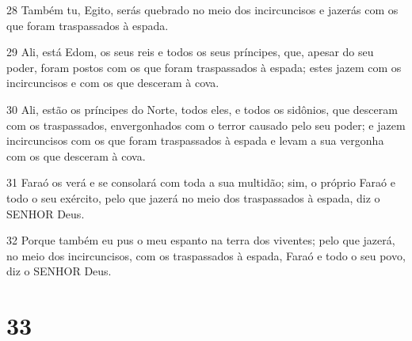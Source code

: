 \par 28 Também tu, Egito, serás quebrado no meio dos incircuncisos e jazerás com os que foram traspassados à espada.
\par 29 Ali, está Edom, os seus reis e todos os seus príncipes, que, apesar do seu poder, foram postos com os que foram traspassados à espada; estes jazem com os incircuncisos e com os que desceram à cova.
\par 30 Ali, estão os príncipes do Norte, todos eles, e todos os sidônios, que desceram com os traspassados, envergonhados com o terror causado pelo seu poder; e jazem incircuncisos com os que foram traspassados à espada e levam a sua vergonha com os que desceram à cova.
\par 31 Faraó os verá e se consolará com toda a sua multidão; sim, o próprio Faraó e todo o seu exército, pelo que jazerá no meio dos traspassados à espada, diz o SENHOR Deus.
\par 32 Porque também eu pus o meu espanto na terra dos viventes; pelo que jazerá, no meio dos incircuncisos, com os traspassados à espada, Faraó e todo o seu povo, diz o SENHOR Deus.

\chapter{33}

